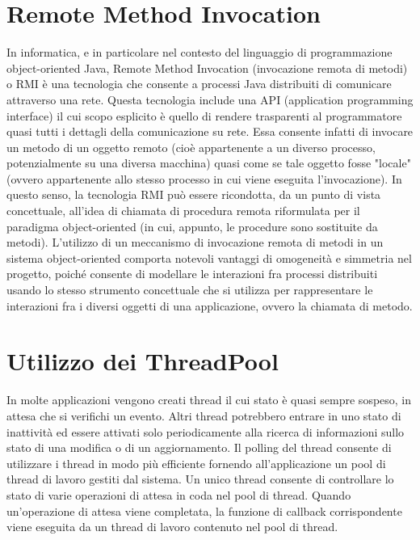 \section{Remote Method Invocation}
In informatica, e in particolare nel contesto del linguaggio di programmazione object-oriented Java, Remote Method Invocation (invocazione remota di metodi) o RMI è una tecnologia che consente a processi Java distribuiti di comunicare attraverso una rete. Questa tecnologia include una API (application programming interface) il cui scopo esplicito è quello di rendere trasparenti al programmatore quasi tutti i dettagli della comunicazione su rete. Essa consente infatti di invocare un metodo di un oggetto remoto (cioè appartenente a un diverso processo, potenzialmente su una diversa macchina) quasi come se tale oggetto fosse "locale" (ovvero appartenente allo stesso processo in cui viene eseguita l'invocazione). In questo senso, la tecnologia RMI può essere ricondotta, da un punto di vista concettuale, all'idea di chiamata di procedura remota riformulata per il paradigma object-oriented (in cui, appunto, le procedure sono sostituite da metodi).
L'utilizzo di un meccanismo di invocazione remota di metodi in un sistema object-oriented comporta notevoli vantaggi di omogeneità e simmetria nel progetto, poiché consente di modellare le interazioni fra processi distribuiti usando lo stesso strumento concettuale che si utilizza per rappresentare le interazioni fra i diversi oggetti di una applicazione, ovvero la chiamata di metodo. 

\section{Utilizzo dei ThreadPool}\label{sec:thread_pool}
In molte applicazioni vengono creati thread il cui stato è quasi sempre sospeso, in attesa che si verifichi un evento. Altri thread potrebbero entrare in uno stato di inattività ed essere attivati solo periodicamente alla ricerca di informazioni sullo stato di una modifica o di un aggiornamento. Il polling del thread consente di utilizzare i thread in modo più efficiente fornendo all'applicazione un pool di thread di lavoro gestiti dal sistema. Un unico thread consente di controllare lo stato di varie operazioni di attesa in coda nel pool di thread. Quando un'operazione di attesa viene completata, la funzione di callback corrispondente viene eseguita da un thread di lavoro contenuto nel pool di thread.


